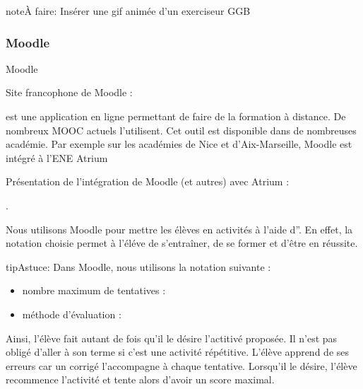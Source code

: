 \documentclass[letterpaper,10pt,french]{sphinxmanual}
\begin{document}
\begin{sphinxadmonition}{note}{\label{projet-description:index-0}À faire:}
Insérer une gif animée d’un exerciseur GGB
\end{sphinxadmonition}


\subsubsection{Moodle}
\label{\detokenize{projet-description:moodle}}
Moodle %
\begin{footnote}[3]\sphinxAtStartFootnote
Site francophone de Moodle : 
%
\end{footnote} est une application en ligne permettant de faire de la formation à
distance. De nombreux MOOC actuels l’utilisent. Cet outil est disponible dans de
nombreuses académie. Par exemple sur les académies de Nice et d’Aix-Marseille, Moodle
est intégré à l’ENE Atrium %
\begin{footnote}[4]\sphinxAtStartFootnote
Présentation de l’intégration de Moodle (et autres) avec
Atrium : 
%
\end{footnote}.

Nous utilisons Moodle pour mettre les élèves en activités à l’aide d”. En effet, la notation choisie permet à l’éléve de s’entraîner, de se
former et d’être en réussite.

\begin{sphinxadmonition}{tip}{Astuce:}
Dans Moodle, nous utilisons la notation suivante :
\begin{itemize}
\item {} 
nombre maximum de tentatives : 

\item {} 
méthode d’évaluation : 

\end{itemize}

\noindent{}
\end{sphinxadmonition}

Ainsi, l’élève fait autant de fois qu’il le désire l’actitivé proposée. Il n’est pas
obligé d’aller à son terme si c’est une activité répétitive. L’élève apprend de ses
erreurs car un corrigé l’accompagne à chaque tentative. Lorsqu’il le désire, l’élève
recommence l’activité et tente alors d’avoir un score maximal.
\end{document}
